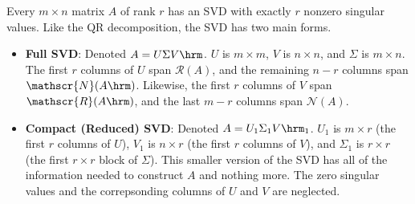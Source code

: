 Every $m\times n$ matrix $A$ of rank $r$ has an SVD with exactly $r$ nonzero singular values.
Like the QR decomposition, the SVD has two main forms.
\begin{itemize}
    \item \textbf{Full SVD}: Denoted $A = U\Sigma V\hrm$.
    $U$ is $m\times m$, $V$ is $n\times n$, and $\Sigma$ is $m\times n$.
    The first $r$ columns of $U$ span $\mathscr{R}(A)$, and the remaining $n -r$ columns span $\mathscr{N}(A\hrm)$.
    Likewise, the first $r$ columns of $V$ span $\mathscr{R}(A\hrm)$, and the last $m - r$ columns span $\mathscr{N}(A)$.
    \item \textbf{Compact (Reduced) SVD}: Denoted $A = U_1\Sigma_1 V\hrm_1$.
    $U_1$ is $m\times r$ (the first $r$ columns of $U$), $V_1$ is $n \times r$ (the first $r$ columns of $V$), and $\Sigma_1$ is $r\times r$ (the first $r\times r$ block of $\Sigma$).
    This smaller version of the SVD has all of the information needed to construct $A$ and nothing more.
    The zero singular values and the correpsonding columns of $U$ and $V$ are neglected.
\end{itemize}
%
